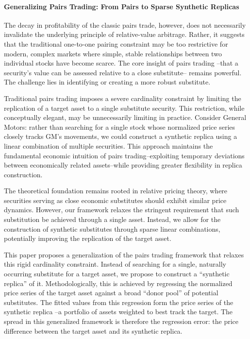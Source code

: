 \paragraph{Generalizing Pairs Trading: From Pairs to Sparse Synthetic Replicas}

The decay in profitability of the classic pairs trade, however, does not necessarily invalidate the underlying principle of relative-value arbitrage. Rather, it suggests that the traditional one-to-one pairing constraint may be too restrictive for modern, complex markets where simple, stable relationships between two individual stocks have become scarce. The core insight of pairs trading --that a security's value can be assessed relative to a close substitute-- remains powerful. The challenge lies in identifying or creating a more robust substitute.

Traditional pairs trading imposes a severe cardinality constraint by limiting the replication of a target asset to a single substitute security. This restriction, while conceptually elegant, may be unnecessarily limiting in practice. Consider General Motors: rather than searching for a single stock whose normalized price series closely tracks GM's movements, we could construct a synthetic replica using a linear combination of multiple securities. This approach maintains the fundamental economic intuition of pairs trading--exploiting temporary deviations between economically related assets--while providing greater flexibility in replica construction.

The theoretical foundation remains rooted in relative pricing theory, where securities serving as close economic substitutes should exhibit similar price dynamics. However, our framework relaxes the stringent requirement that such substitution be achieved through a single asset. Instead, we allow for the construction of synthetic substitutes through sparse linear combinations, potentially improving the replication of the target asset.

This paper proposes a generalization of the pairs trading framework that relaxes this rigid cardinality constraint. Instead of searching for a single, naturally occurring substitute for a target asset, we propose to construct a ``synthetic replica'' of it. Methodologically, this is achieved by regressing the normalized price series of the target asset against a broad ``donor pool'' of potential substitutes. The fitted values from this regression form the price series of the synthetic replica --a portfolio of assets weighted to best track the target. The spread in this generalized framework is therefore the regression error: the price difference between the target asset and its synthetic replica. 

